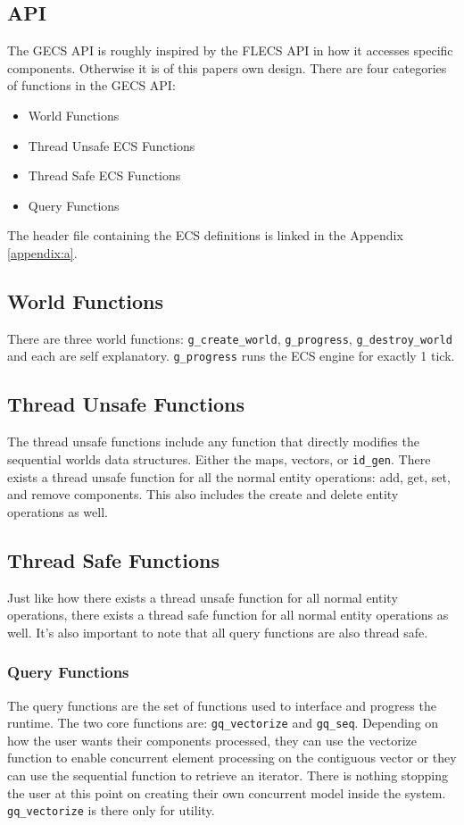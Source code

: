 \subsection{API}
The GECS API is roughly inspired by the FLECS API in how it accesses specific components. Otherwise it is of this papers own design. There are four categories of functions in the GECS API:
\begin{itemize}
    \item World Functions
    \item Thread Unsafe ECS Functions
    \item Thread Safe ECS Functions
    \item Query Functions
\end{itemize}

The header file containing the ECS definitions is linked in the Appendix \ref{appendix:a}.

\subsection{World Functions}
There are three world functions: \texttt{g\_create\_world}, \texttt{g\_progress}, \texttt{g\_destroy\_world} and each are self explanatory. \texttt{g\_progress} runs the ECS engine for exactly 1 tick.

\subsection{Thread Unsafe Functions}
The thread unsafe functions include any function that directly modifies the sequential worlds data structures. Either the maps, vectors, or \texttt{id\_gen}. There exists a thread unsafe function for all the normal entity operations: add, get, set, and remove components. This also includes the create and delete entity operations as well.  

\subsection{Thread Safe Functions}
Just like how there exists a thread unsafe function for all normal entity operations, there exists a thread safe function for all normal entity operations as well. It's also important to note that all query functions are also thread safe.

\subsubsection{Query Functions}
The query functions are the set of functions used to interface and progress the runtime. The two core functions are: \texttt{gq\_vectorize} and \texttt{gq\_seq}. Depending on how the user wants their components processed, they can use the vectorize function to enable concurrent element processing on the contiguous vector or they can use the sequential function to retrieve an iterator. There is nothing stopping the user at this point on creating their own concurrent model inside the system. \texttt{gq\_vectorize} is there only for utility.

